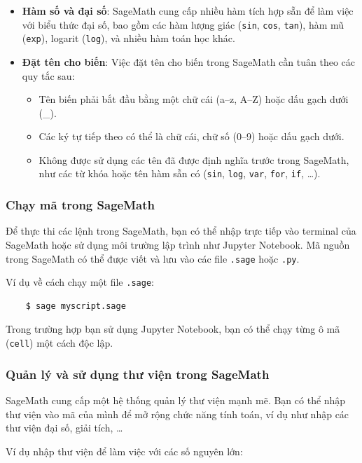 \begin{itemize}
	\item \textbf{Hàm số và đại số}: SageMath cung cấp nhiều hàm tích hợp sẵn để làm việc với biểu thức đại số, bao gồm các hàm lượng giác (\texttt{sin}, \texttt{cos}, \texttt{tan}), hàm mũ (\texttt{exp}), logarit (\texttt{log}), và nhiều hàm toán học khác.
	
	\item \textbf{Đặt tên cho biến}: Việc đặt tên cho biến trong SageMath cần tuân theo các quy tắc sau:
	\begin{itemize}
		\item Tên biến phải bắt đầu bằng một chữ cái (a–z, A–Z) hoặc dấu gạch dưới (\_).
		\item Các ký tự tiếp theo có thể là chữ cái, chữ số (0–9) hoặc dấu gạch dưới.
		\item Không được sử dụng các tên đã được định nghĩa trước trong SageMath, như các từ khóa hoặc tên hàm sẵn có (\texttt{sin}, \texttt{log}, \texttt{var}, \texttt{for}, \texttt{if}, \dots).
	\end{itemize}
\end{itemize}

\subsubsection{Chạy mã trong SageMath}
Để thực thi các lệnh trong SageMath, bạn có thể nhập trực tiếp vào terminal của SageMath hoặc sử dụng môi trường lập trình như Jupyter Notebook. Mã nguồn trong SageMath có thể được viết và lưu vào các file \texttt{.sage} hoặc \texttt{.py}.

Ví dụ về cách chạy một file \texttt{.sage}:

\begin{lstlisting}
	$ sage myscript.sage
\end{lstlisting}

Trong trường hợp bạn sử dụng Jupyter Notebook, bạn có thể chạy từng ô mã (\texttt{cell}) một cách độc lập.

\subsubsection{Quản lý và sử dụng thư viện trong SageMath}
SageMath cung cấp một hệ thống quản lý thư viện mạnh mẽ. Bạn có thể nhập thư viện vào mã của mình để mở rộng chức năng tính toán, ví dụ như nhập các thư viện đại số, giải tích, \dots

Ví dụ nhập thư viện để làm việc với các số nguyên lớn:

